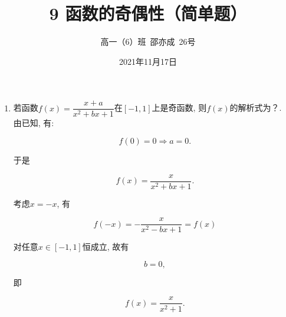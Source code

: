 \documentclass[8pt]{article}
\author{高一（6）班\ 邵亦成\ 26号}
\title{9 函数的奇偶性（简单题）}
\date{2021年11月17日}
\begin{document}
	\maketitle

	\begin{enumerate}[label=(\arabic*)]
		\item 若函数$f(x)=\dfrac{x+a}{x^2+bx+1}$在$[-1, 1]$上是奇函数, 则$f(x)$的解析式为？.
			~\\

			由已知, 有:

			$$
			f(0) = 0 \Rightarrow a = 0.
			$$

			于是

			$$f(x)=\frac{x}{x^2+bx+1}.$$

			考虑$x=-x$, 有

			$$f(-x)=-\frac{x}{x^2-bx+1}=f(x)$$

			对任意$x\in [-1, 1]$恒成立, 故有

			$$b=0,$$

			即

			$$f(x)=\frac{x}{x^2+1}.$$

	\end{enumerate}
\end{document}
